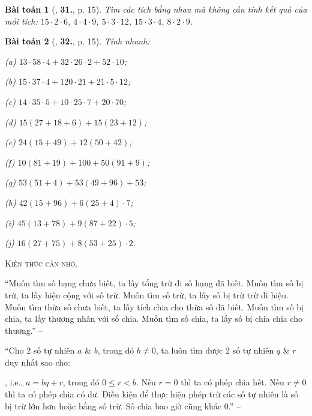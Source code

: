 \documentclass{article}
\numberwithin{equation}{section}
\newtheorem{baitoan}{Bài toán}[section]
\begin{document}
\begin{baitoan}[\cite{Trong_Toan_6_2021}, \textbf{31.}, p. 15]
	Tìm các tích bằng nhau mà không cần tính kết quả của mỗi tích: $15\cdot 2\cdot 6$, $4\cdot 4\cdot 9$, $5\cdot 3\cdot 12$, $15\cdot 3\cdot 4$, $8\cdot 2\cdot 9$.
\end{baitoan}

\begin{baitoan}[\cite{Trong_Toan_6_2021}, \textbf{32.}, p. 15]
	Tính nhanh:
	\begin{enumerate*}
		\item[(a)] $13\cdot 58\cdot 4 + 32\cdot 26\cdot 2 + 52\cdot 10$;
		\item[(b)] $15\cdot 37\cdot 4 + 120\cdot 21 + 21\cdot 5\cdot 12$;
		\item[(c)] $14\cdot 35\cdot 5 + 10\cdot 25\cdot 7 + 20\cdot 70$;
		\item[(d)] $15(27 + 18 + 6) + 15(23 + 12)$;
		\item[(e)] $24(15 + 49) + 12(50 + 42)$;
		\item[(f)] $10(81 + 19) + 100 + 50(91 + 9)$;
		\item[(g)] $53(51 + 4) + 53(49 + 96) + 53$;
		\item[(h)] $42(15 + 96) + 6(25 + 4)\cdot 7$;
		\item[(i)] $45(13 + 78) + 9(87 + 22)\cdot 5$;
		\item[(j)] $16(27 + 75) + 8(53 + 25)\cdot 2$.
	\end{enumerate*}
\end{baitoan}
\noindent\textsc{Kiến thức cần nhớ.}
\begin{tcolorbox}
	``Muốn tìm số hạng chưa biết, ta lấy tổng trừ đi số hạng đã biết. Muốn tìm số bị trừ, ta lấy hiệu cộng với số trừ. Muốn tìm số trừ, ta lấy số bị trừ trừ đi hiệu. Muốn tìm thừa số chưa biết, ta lấy tích chia cho thừa số đã biết. Muốn tìm số bị chia, ta lấy thương nhân với số chia. Muốn tìm số chia, ta lấy số bị chia chia cho thương.'' -- \cite[p. 16]{Trong_Toan_6_2021}
	
	``Cho 2 số tự nhiên $a$ \& $b$, trong đó $b\ne 0$, ta luôn tìm được 2 số tự nhiên $q$ \& $r$ duy nhất sao cho:
	
	, i.e., $a = bq + r$, trong đó $0\le r < b$. Nếu $r = 0$ thì ta có phép chia hết. Nếu $r\ne 0$ thì ta có phép chia có dư. Điều kiện để thực hiện phép trừ các số tự nhiên là số bị trừ lớn hơn hoặc bằng số trừ. Số chia bao giờ cũng khác $0$.'' -- \cite[p. 18]{Trong_Toan_6_2021}
\end{tcolorbox}
\end{document}
